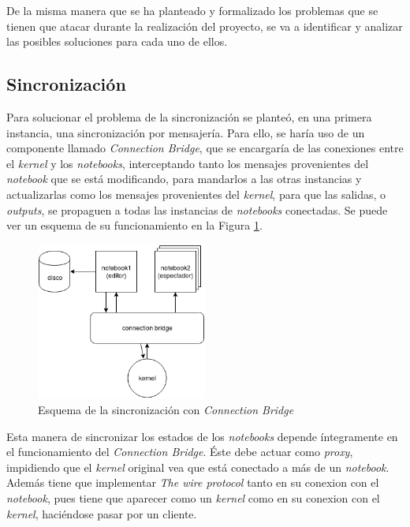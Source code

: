 \documentclass[11pt,spanish,listoffigures]{tfgetsinf}
\begin{document}
De la misma manera que se ha planteado y formalizado los problemas que se tienen que atacar durante la realización del proyecto, se va a identificar y analizar las posibles soluciones para cada uno de ellos. 


\subsection{Sincronización}
\label{subsec:sincro}

Para solucionar el problema de la sincronización se planteó, en una primera instancia, una sincronización por mensajería. Para ello, se haría uso de un componente llamado \textit{Connection Bridge}, que se encargaría de las conexiones entre el \textit{kernel} y los \textit{notebooks}, interceptando tanto los mensajes provenientes del \textit{notebook} que se está modificando, para mandarlos a las otras instancias y actualizarlas como los mensajes provenientes del \textit{kernel}, para que las salidas, o \textit{outputs}, se propaguen a todas las instancias de \textit{notebooks} conectadas. Se puede ver un esquema de su funcionamiento en la Figura \ref{fig:cb-scheme}.

\begin{figure}[h]
	\centering
  	\includegraphics[width=0.5\textwidth]{Connection_Bridge.png}
  	\caption{Esquema de la sincronización con \textit{Connection Bridge}}
  	\label{fig:cb-scheme}
\end{figure}

Esta manera de sincronizar los estados de los \textit{notebooks} depende íntegramente en el funcionamiento del \textit{Connection Bridge}. Éste debe actuar como \textit{proxy}, impidiendo que el \textit{kernel} original vea que está conectado a más de un \textit{notebook}. Además tiene que implementar \textit{The wire protocol} \cite{wire-protocol} tanto en su conexion con el \textit{notebook}, pues tiene que aparecer como un \textit{kernel} como en su conexion con el \textit{kernel}, haciéndose pasar por un cliente. 
\end{document}
